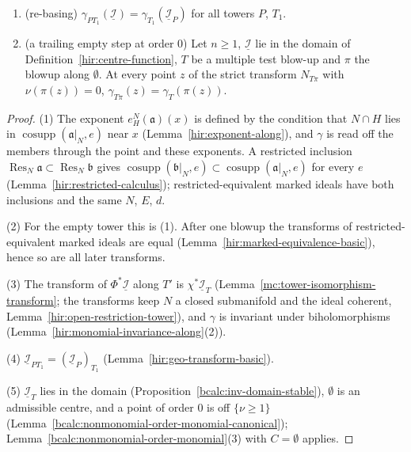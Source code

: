 \begin{lemma}
\begin{enumerate}
\(T\) a multiple test blow-up of \(\underline{\mathcal I}\), \(N\) a closed submanifold and the ideal coherent. Then \(\gamma_{T'}(\Phi^*\underline{\mathcal I})(p)=\gamma_T(\underline{\mathcal I})(\chi(p))\).
\item (re-basing) \(\gamma_{PT_1}(\underline{\mathcal I})=\gamma_{T_1}(\underline{\mathcal I}_P)\) for all towers \(P\), \(T_1\).
\item (a trailing empty step at order \(0\)) Let \(n\ge1\), \(\underline{\mathcal I}\) lie in the domain of Definition~\ref{hir:centre-function}, \(T\) be a multiple test blow-up and
\(\pi\) the blowup along \(\emptyset\). At every point \(z\) of the strict transform \(N_{T\pi}\) with \(\nu(\pi(z))=0\), \(\gamma_{T\pi}(z)=\gamma_T(\pi(z))\).
\end{enumerate}
\end{lemma}
\begin{proof}
\mixedleanok
(1) The exponent \(e^N_H(\mathfrak a)(x)\) is defined by the condition that \(N\cap H\) lies in \(\operatorname{cosupp}(\mathfrak a|_N,e)\) near \(x\)
(Lemma~\ref{hir:exponent-along}), and \(\gamma\) is read off the members through the point and these exponents. A restricted inclusion
\(\operatorname{Res}_N\mathfrak a\subset\operatorname{Res}_N\mathfrak b\) gives \(\operatorname{cosupp}(\mathfrak b|_N,e)\subset\operatorname{cosupp}(\mathfrak a|_N,e)\) for every \(e\)
(Lemma~\ref{hir:restricted-calculus}); restricted-equivalent marked ideals have both inclusions and the same \(N\), \(E\), \(d\).

(2) For the empty tower this is (1). After one blowup the transforms of restricted-equivalent marked ideals are equal (Lemma~\ref{hir:marked-equivalence-basic}),
hence so are all later transforms.

(3) The transform of \(\Phi^*\underline{\mathcal I}\) along \(T'\) is \(\chi^*\underline{\mathcal I}_T\) (Lemma~\ref{mc:tower-isomorphism-transform}; the transforms keep \(N\) a closed submanifold
and the ideal coherent, Lemma~\ref{hir:open-restriction-tower}), and \(\gamma\) is invariant under biholomorphisms (Lemma~\ref{hir:monomial-invariance-along}(2)).

(4) \(\underline{\mathcal I}_{PT_1}=(\underline{\mathcal I}_P)_{T_1}\) (Lemma~\ref{hir:geo-transform-basic}).

(5) \(\underline{\mathcal I}_T\) lies in the domain (Proposition~\ref{bcalc:inv-domain-stable}), \(\emptyset\) is an admissible centre, and a point of order \(0\) is off \(\{\nu\ge1\}\)
(Lemma~\ref{bcalc:nonmonomial-order-monomial-canonical}); Lemma~\ref{bcalc:nonmonomial-order-monomial}(3) with \(C=\emptyset\) applies.
\end{proof}

